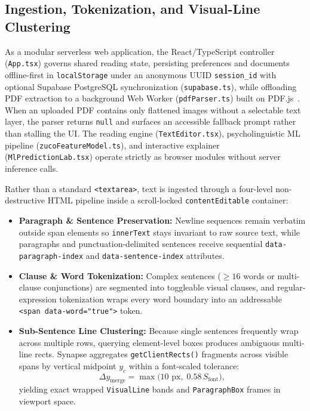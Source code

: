 \documentclass[conference]{IEEEtran}
\begin{document}
\subsection{Ingestion, Tokenization, and Visual-Line Clustering}
As a modular serverless web application, the React/TypeScript controller (\texttt{App.tsx}) governs shared reading state, persisting preferences and documents offline-first in \texttt{localStorage} under an anonymous UUID \texttt{session\_id} with optional Supabase PostgreSQL synchronization (\texttt{supabase.ts}), while offloading PDF extraction to a background Web Worker (\texttt{pdfParser.ts}) built on PDF.js~\cite{15}. When an uploaded PDF contains only flattened images without a selectable text layer, the parser returns \texttt{null} and surfaces an accessible fallback prompt rather than stalling the UI. The reading engine (\texttt{TextEditor.tsx}), psycholinguistic ML pipeline (\texttt{zucoFeatureModel.ts}), and interactive explainer (\texttt{MlPredictionLab.tsx}) operate strictly as browser modules without server inference calls.

Rather than a standard \texttt{<textarea>}, text is ingested through a four-level non-destructive HTML pipeline inside a scroll-locked \texttt{contentEditable} container:
\begin{itemize}
    \item \textbf{Paragraph \& Sentence Preservation:} Newline sequences remain verbatim outside span elements so \texttt{innerText} stays invariant to raw source text, while paragraphs and punctuation-delimited sentences receive sequential \texttt{data-paragraph-index} and \texttt{data-sentence-index} attributes.
    \item \textbf{Clause \& Word Tokenization:} Complex sentences ($\ge 16$ words or multi-clause conjunctions) are segmented into toggleable visual clauses, and regular-expression tokenization wraps every word boundary into an addressable \texttt{<span data-word="true">} token.
    \item \textbf{Sub-Sentence Line Clustering:} Because single sentences frequently wrap across multiple rows, querying element-level boxes produces ambiguous multi-line rects. Synapse aggregates \texttt{getClientRects()} fragments across visible spans by vertical midpoint $y_c$ within a font-scaled tolerance:
    \begin{equation}
        \Delta y_{\text{merge}} = \max\!\big(10\text{ px},\; 0.58\, S_{\text{font}}\big),
    \end{equation}
    yielding exact wrapped \texttt{VisualLine} bands and \texttt{ParagraphBox} frames in viewport space.
\end{itemize}
\end{document}
